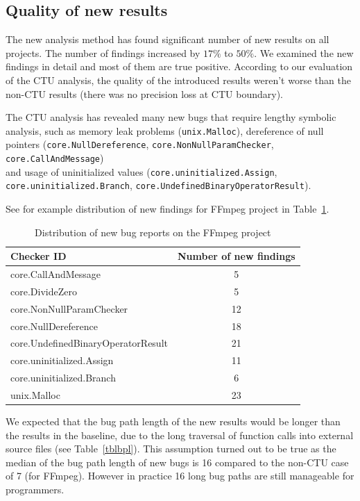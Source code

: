 \documentclass{article}
\begin{document}
\subsection{Quality of new results}
The new analysis method has found significant number of new results on all projects. 
The number of findings increased by $17\%$ to $50\%$.
We examined the new findings in detail and most of them are true positive.
According to our evaluation of the CTU analysis, the quality of the introduced results
weren't worse than the non-CTU results (there was no precision loss at CTU boundary).

The CTU analysis has revealed many new bugs that require lengthy symbolic analysis,
such as memory leak problems (\texttt{unix.Malloc}), dereference of null pointers
(\texttt{core.NullDereference}, \texttt{core.NonNullParamChecker},
\texttt{core.CallAndMessage}) \\ and usage of uninitialized values
(\texttt{core.uninitialized.Assign}, \\ \texttt{core.uninitialized.Branch},
\texttt{core.UndefinedBinaryOperatorResult}).

See for example distribution of new findings for FFmpeg project in 
Table~\ref{tblffmpegbugs}.

\begin {table}[h!]
\centering
\begin{tabular}{| l|| c |}
\hline
Checker ID&                          Number of new findings \\
\hline
\hline
core.CallAndMessage                &  5 \\
\hline
core.DivideZero                    & 5 \\     
\hline
core.NonNullParamChecker           & 12 \\     
\hline
core.NullDereference               & 18 \\     
\hline
core.UndefinedBinaryOperatorResult & 21 \\     
\hline
core.uninitialized.Assign          & 11 \\     
\hline
core.uninitialized.Branch          & 6  \\     
\hline
unix.Malloc                        & 23 \\
\hline
\end{tabular}
\caption{Distribution of new bug reports on the FFmpeg project}
\label{tblffmpegbugs}
\end{table}

We expected that the bug path length of the new results would be longer 
than the results in the baseline, due to the long traversal of function 
calls into external source files (see Table~\ref{tblbpl}). This assumption turned out to be true as
the median of the bug path length of new bugs is 16 compared to the non-CTU
case of 7 (for FFmpeg). However in practice 16 long bug paths are still 
manageable for programmers.
\end{document}
